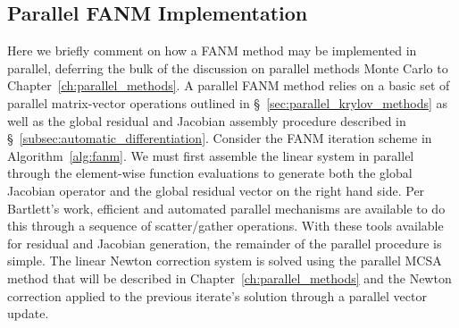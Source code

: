 \subsection{Parallel FANM Implementation}
\label{subsec:parallel_fanm}
Here we briefly comment on how a FANM method may be implemented in
parallel, deferring the bulk of the discussion on parallel methods
Monte Carlo to Chapter~\ref{ch:parallel_methods}. A parallel FANM
method relies on a basic set of parallel matrix-vector operations
outlined in \S~\ref{sec:parallel_krylov_methods} as well as the global
residual and Jacobian assembly procedure described in
\S~\ref{subsec:automatic_differentiation}. Consider the FANM iteration
scheme in Algorithm~\ref{alg:fanm}. We must first assemble the linear
system in parallel through the element-wise function evaluations to
generate both the global Jacobian operator and the global residual
vector on the right hand side. Per Bartlett's work, efficient and
automated parallel mechanisms are available to do this through a
sequence of scatter/gather operations. With these tools available for
residual and Jacobian generation, the remainder of the parallel
procedure is simple. The linear Newton correction system is solved
using the parallel MCSA method that will be described in
Chapter~\ref{ch:parallel_methods} and the Newton correction applied to
the previous iterate's solution through a parallel vector update.

\clearpage 

